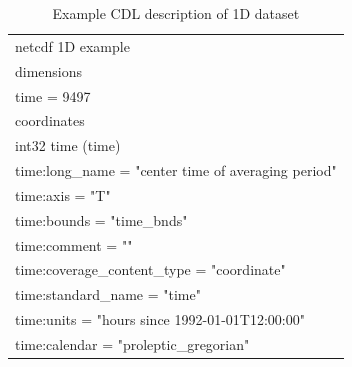 \begin{longtable}{|p{\textwidth}|}
\caption{Example CDL description of 1D dataset}
\label{tab:cdl-1D} \\
\hline \endhead
\hline \endfoot
netcdf 1D example\\
dimensions\\
\hline
\rowcolor{YellowGreen}  time = 9497\\
\hline

coordinates\\
\hline
\rowcolor{Apricot}\hspace{0.5cm}int32 time (time)\\
\rowcolor{Apricot}\hspace{0.5cm}\hspace{0.5cm}time:long\_name = "center time of averaging period"\\
\rowcolor{Apricot}\hspace{0.5cm}\hspace{0.5cm}time:axis = "T"\\
\rowcolor{Apricot}\hspace{0.5cm}\hspace{0.5cm}time:bounds = "time\_bnds"\\
\rowcolor{Apricot}\hspace{0.5cm}\hspace{0.5cm}time:comment = ""\\
\rowcolor{Apricot}\hspace{0.5cm}\hspace{0.5cm}time:coverage\_content\_type = "coordinate"\\
\rowcolor{Apricot}\hspace{0.5cm}\hspace{0.5cm}time:standard\_name = "time"\\
\rowcolor{Apricot}\hspace{0.5cm}\hspace{0.5cm}time:units = "hours since 1992-01-01T12:00:00"\\
\rowcolor{Apricot}\hspace{0.5cm}\hspace{0.5cm}time:calendar = "proleptic\_gregorian"\\
\hline


\end{longtable}
